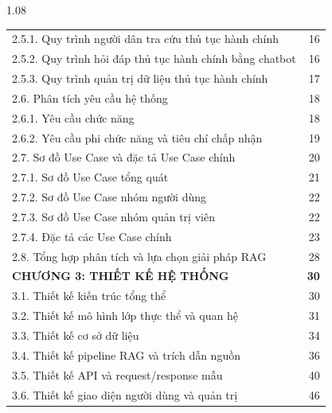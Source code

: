 \begin{spacing}{1.08}
\begin{longtable}{@{}p{}r@{}}
\hspace*{0.75cm} 2.5.1. Quy trình người dân tra cứu thủ tục hành chính & 16\\
\hspace*{0.75cm} 2.5.2. Quy trình hỏi đáp thủ tục hành chính bằng chatbot & 16\\
\hspace*{0.75cm} 2.5.3. Quy trình quản trị dữ liệu thủ tục hành chính & 17\\
\hspace*{0.35cm} 2.6. Phân tích yêu cầu hệ thống & 18\\
\hspace*{0.75cm} 2.6.1. Yêu cầu chức năng & 18\\
\hspace*{0.75cm} 2.6.2. Yêu cầu phi chức năng và tiêu chí chấp nhận & 19\\
\hspace*{0.35cm} 2.7. Sơ đồ Use Case và đặc tả Use Case chính & 20\\
\hspace*{0.75cm} 2.7.1. Sơ đồ Use Case tổng quát & 21\\
\hspace*{0.75cm} 2.7.2. Sơ đồ Use Case nhóm người dùng & 22\\
\hspace*{0.75cm} 2.7.3. Sơ đồ Use Case nhóm quản trị viên & 22\\
\hspace*{0.75cm} 2.7.4. Đặc tả các Use Case chính & 23\\
\hspace*{0.35cm} 2.8. Tổng hợp phân tích và lựa chọn giải pháp RAG & 28\\
\textbf{CHƯƠNG 3: THIẾT KẾ HỆ THỐNG} & \textbf{30}\\
\hspace*{0.35cm} 3.1. Thiết kế kiến trúc tổng thể & 30\\
\hspace*{0.35cm} 3.2. Thiết kế mô hình lớp thực thể và quan hệ & 31\\
\hspace*{0.35cm} 3.3. Thiết kế cơ sở dữ liệu & 34\\
\hspace*{0.35cm} 3.4. Thiết kế pipeline RAG và trích dẫn nguồn & 36\\
\hspace*{0.35cm} 3.5. Thiết kế API và request/response mẫu & 40\\
\hspace*{0.35cm} 3.6. Thiết kế giao diện người dùng và quản trị & 46\\

\end{longtable}
\end{spacing}
